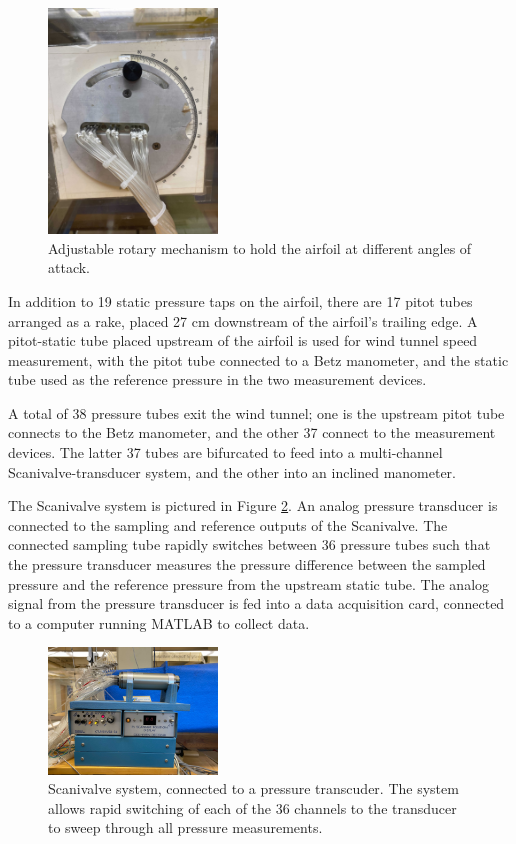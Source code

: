\documentclass[runningheads]{llncs}
\begin{document}
\begin{figure}
    \centering
    \includegraphics[width=0.4\textwidth]{Apparatus Pictures/aoa_selector.jpg}
    \caption{Adjustable rotary mechanism to hold the airfoil at different angles of attack.}
    \label{fig:aoa_select}
\end{figure}

In addition to 19 static pressure taps on the airfoil, there are 17 pitot tubes arranged as a rake, placed 27 cm downstream of the airfoil's trailing edge. A pitot-static tube placed upstream of the airfoil is used for wind tunnel speed measurement, with the pitot tube connected to a Betz manometer, and the static tube used as the reference pressure in the two measurement devices.

A total of 38 pressure tubes exit the wind tunnel; one is the upstream pitot tube connects to the Betz manometer, and the other 37 connect to the measurement devices. The latter 37 tubes are bifurcated to feed into a multi-channel Scanivalve-transducer system, and the other into an inclined manometer.

The Scanivalve system is pictured in Figure \ref{fig:scanivalve}. An analog pressure transducer is connected to the sampling and reference outputs of the Scanivalve. The connected sampling tube rapidly switches between 36 pressure tubes such that the pressure transducer measures the pressure difference between the sampled pressure and the reference pressure from the upstream static tube. The analog signal from the pressure transducer is fed into a data acquisition card, connected to a computer running MATLAB to collect data.

\begin{figure}[h]
    \centering
    \includegraphics[width=0.4\textwidth]{Apparatus Pictures/scanivalve.jpg}
    \caption{Scanivalve system, connected to a pressure transcuder. The system allows rapid switching of each of the 36 channels to the transducer to sweep through all pressure measurements.}
    \label{fig:scanivalve}
\end{figure}
\end{document}
